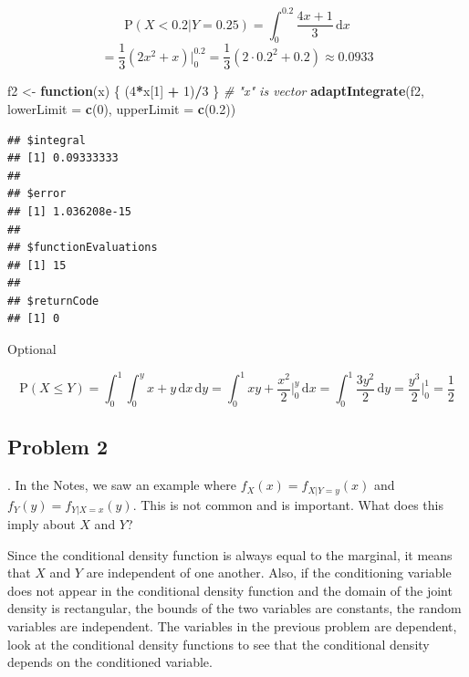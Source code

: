 \documentclass[
]{book}
\newenvironment{Shaded}{\begin{snugshade}}{\end{snugshade}}
\newcommand{\CommentTok}[1]{\textcolor[rgb]{0.56,0.35,0.01}{\textit{#1}}}
\newcommand{\ControlFlowTok}[1]{\textcolor[rgb]{0.13,0.29,0.53}{\textbf{#1}}}
\newcommand{\DataTypeTok}[1]{\textcolor[rgb]{0.13,0.29,0.53}{#1}}
\newcommand{\DecValTok}[1]{\textcolor[rgb]{0.00,0.00,0.81}{#1}}
\newcommand{\FloatTok}[1]{\textcolor[rgb]{0.00,0.00,0.81}{#1}}
\newcommand{\KeywordTok}[1]{\textcolor[rgb]{0.13,0.29,0.53}{\textbf{#1}}}
\newcommand{\NormalTok}[1]{#1}
\newcommand{\OperatorTok}[1]{\textcolor[rgb]{0.81,0.36,0.00}{\textbf{#1}}}
\newcommand{\StringTok}[1]{\textcolor[rgb]{0.31,0.60,0.02}{#1}}
\begin{document}
\[
\mbox{P}(X<0.2|Y= 0.25) =  \int_{0}^{0.2} \frac{4x+1}{3} \,\mathrm{d}x
\]
\[
=\frac{1}{3}\left( 2x^2 +x \right) \bigg|_0^{0.2} = \frac{1}{3}\left( 2\cdot0.2^2 +0.2 \right) \approx 0.0933
\]

\begin{Shaded}
\begin{Highlighting}[]
\NormalTok{f2 <-}\StringTok{ }\ControlFlowTok{function}\NormalTok{(x) \{ (}\DecValTok{4}\OperatorTok{*}\NormalTok{x[}\DecValTok{1}\NormalTok{] }\OperatorTok{+}\StringTok{ }\DecValTok{1}\NormalTok{)}\OperatorTok{/}\DecValTok{3}\NormalTok{ \} }\CommentTok{# "x" is vector}
\KeywordTok{adaptIntegrate}\NormalTok{(f2, }\DataTypeTok{lowerLimit =} \KeywordTok{c}\NormalTok{(}\DecValTok{0}\NormalTok{), }\DataTypeTok{upperLimit =} \KeywordTok{c}\NormalTok{(}\FloatTok{0.2}\NormalTok{))}
\end{Highlighting}
\end{Shaded}

\begin{verbatim}
## $integral
## [1] 0.09333333
## 
## $error
## [1] 1.036208e-15
## 
## $functionEvaluations
## [1] 15
## 
## $returnCode
## [1] 0
\end{verbatim}

Optional

\[
\mbox{P}(X\leq Y)=\int_0^1\int_0^y x+y \,\mathrm{d}x \,\mathrm{d}y = \int_0^1 xy+\frac{x^2}{2}\bigg|_0^y \,\mathrm{d}x = \int_0^1 \frac{3y^2}{2}\,\mathrm{d}y = \frac{y^3}{2}\bigg|_0^1 = \frac{1}{2}
\]

\hypertarget{problem-2-13}{%
\subsection{Problem 2}\label{problem-2-13}}

. In the Notes, we saw an example where \(f_X(x)=f_{X|Y=y}(x)\) and \(f_Y(y)=f_{Y|X=x}(y)\). This is not common and is important. What does this imply about \(X\) and \(Y\)?

Since the conditional density function is always equal to the marginal, it means that \(X\) and \(Y\) are independent of one another. Also, if the conditioning variable does not appear in the conditional density function and the domain of the joint density is rectangular, the bounds of the two variables are constants, the random variables are independent. The variables in the previous problem are dependent, look at the conditional density functions to see that the conditional density depends on the conditioned variable.
\end{document}
